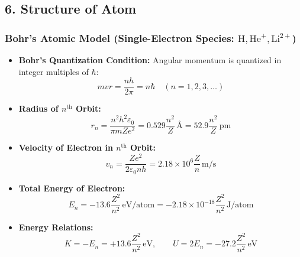 \documentclass[11pt,a4paper]{article}
\begin{document}
\subsection{6. Structure of Atom}

\subsubsection{Bohr's Atomic Model (Single-Electron Species: $\text{H}, \text{He}^+, \text{Li}^{2+}$)}
\begin{itemize}[leftmargin=1.5em, itemsep=2pt]
  \item \textbf{Bohr's Quantization Condition:} Angular momentum is quantized in integer multiples of $\hbar$:
  \[
    m v r = \frac{n h}{2\pi} = n\hbar \quad (n = 1, 2, 3, \dots)
  \]
  \item \textbf{Radius of $n^{\text{th}}$ Orbit:}
  \[
    r_n = \frac{n^2 h^2 \varepsilon_0}{\pi m Z e^2} = 0.529 \frac{n^2}{Z} \, \text{\AA} = 52.9 \frac{n^2}{Z} \, \text{pm}
  \]
  \item \textbf{Velocity of Electron in $n^{\text{th}}$ Orbit:}
  \[
    v_n = \frac{Z e^2}{2 \varepsilon_0 n h} = 2.18 \times 10^6 \frac{Z}{n} \, \text{m/s}
  \]
  \item \textbf{Total Energy of Electron:}
  \[
    E_n = -13.6 \frac{Z^2}{n^2} \, \text{eV/atom} = -2.18 \times 10^{-18} \frac{Z^2}{n^2} \, \text{J/atom}
  \]
  \item \textbf{Energy Relations:}
  \[
    K = -E_n = +13.6 \frac{Z^2}{n^2} \, \text{eV}, \qquad U = 2 E_n = -27.2 \frac{Z^2}{n^2} \, \text{eV}
  \]
\end{itemize}
\end{document}
